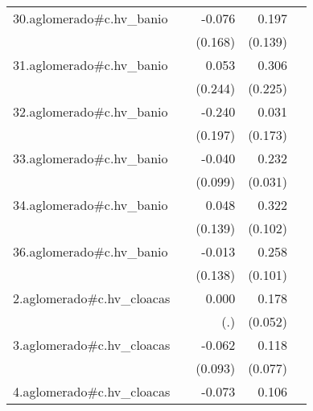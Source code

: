 {\begin{longtable}{l*{4}{D{.}{.}{-1}}}
\addlinespace
30.aglomerado#c.hv\_banio&                     &      -0.076         &       0.197         &                     \\
            &                     &     (0.168)         &     (0.139)         &                     \\
\addlinespace
31.aglomerado#c.hv\_banio&                     &       0.053         &       0.306         &                     \\
            &                     &     (0.244)         &     (0.225)         &                     \\
\addlinespace
32.aglomerado#c.hv\_banio&                     &      -0.240         &       0.031         &                     \\
            &                     &     (0.197)         &     (0.173)         &                     \\
\addlinespace
33.aglomerado#c.hv\_banio&                     &      -0.040         &       0.232\sym{***}&                     \\
            &                     &     (0.099)         &     (0.031)         &                     \\
\addlinespace
34.aglomerado#c.hv\_banio&                     &       0.048         &       0.322\sym{**} &                     \\
            &                     &     (0.139)         &     (0.102)         &                     \\
\addlinespace
36.aglomerado#c.hv\_banio&                     &      -0.013         &       0.258\sym{*}  &                     \\
            &                     &     (0.138)         &     (0.101)         &                     \\
\addlinespace
2.aglomerado#c.hv\_cloacas&                     &       0.000         &       0.178\sym{***}&                     \\
            &                     &         (.)         &     (0.052)         &                     \\
\addlinespace
3.aglomerado#c.hv\_cloacas&                     &      -0.062         &       0.118         &                     \\
            &                     &     (0.093)         &     (0.077)         &                     \\
\addlinespace
4.aglomerado#c.hv\_cloacas&                     &      -0.073         &       0.106\sym{**} &                     \\

\end{longtable}}
